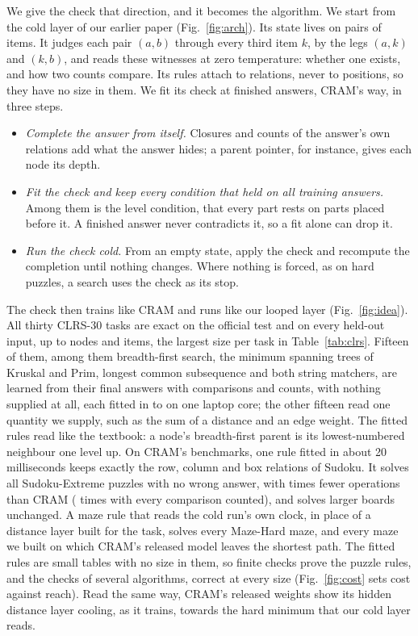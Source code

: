 We give the check that direction, and it becomes the algorithm. We start from the cold layer of our earlier
paper\cite{mohsenvand2026zero} (Fig.~\ref{fig:arch}). Its state lives on pairs of items. It judges each pair $(a,b)$ through every third item
$k$, by the legs $(a,k)$ and $(k,b)$, and reads these witnesses at zero temperature: whether one exists, and how two
counts compare. Its rules attach to relations, never to positions, so they have no size in them. We fit its check at
finished answers, CRAM's way, in three steps.
\begin{itemize}
\setlength{\itemsep}{0pt}
\item \emph{Complete the answer from itself.} Closures and counts of the answer's own relations add what the answer
hides; a parent pointer, for instance, gives each node its depth.
\item \emph{Fit the check and keep every condition that held on all training answers.} Among them is the level
condition, that every part rests on parts placed before it. A finished answer never contradicts it, so a fit alone can
drop it.
\item \emph{Run the check cold.} From an empty state, apply the check and recompute the completion until nothing changes.
Where nothing is forced, as on hard puzzles, a search uses the check as its stop.
\end{itemize}

The check then trains like CRAM and runs like our looped layer (Fig.~\ref{fig:idea}). All thirty CLRS-30 tasks are
exact on the official test and on every held-out input, up to  nodes and  items,
the largest size per task in Table~\ref{tab:clrs}. Fifteen of them, among them breadth-first search, the minimum spanning
trees of Kruskal and Prim, longest common subsequence and both string matchers, are learned from their final answers
with comparisons and counts,  with nothing supplied at all, each fitted in  to  on one laptop core; the other fifteen read one quantity we supply,
such as the sum of a distance and an edge weight. The fitted rules read like the textbook: a node's breadth-first parent
is its lowest-numbered neighbour one level up. On CRAM's benchmarks, one rule fitted in about 20 milliseconds keeps
exactly the row, column and box relations of Sudoku. It solves all  Sudoku-Extreme puzzles with no
wrong answer, with  times fewer operations than CRAM ( times with every comparison
counted), and solves larger boards unchanged. A maze
rule that reads the cold run's own clock, in place of a distance layer built for the task, solves every Maze-Hard maze,
and every maze we built on which CRAM's released model leaves the shortest path. The fitted rules are small tables with
no size in them, so finite checks prove the puzzle rules, and the checks of several algorithms, correct at every size
(Fig.~\ref{fig:cost} sets cost against reach). Read the same way, CRAM's released weights show its hidden distance
layer cooling, as it trains, towards the hard minimum that our cold layer reads.
